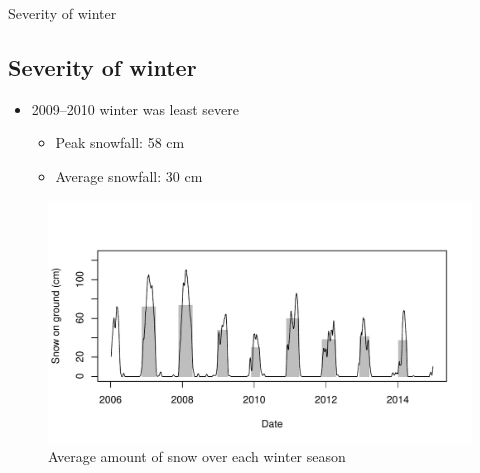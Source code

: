 \documentclass{beamer}
\begin{document}
\begin{frame}{Severity of winter}

\subsection{Severity of winter}

\begin{itemize}
\item 2009--2010 winter was least severe
\begin{itemize}
\item Peak snowfall: 58 cm
\item Average snowfall: 30 cm
\end{itemize}
\end{itemize}

\begin{figure}
\vspace{-12mm}
\includegraphics[width=1.0\textwidth]{report-barplots}
\vspace{-5mm}
\caption{{\footnotesize Average amount of snow over each winter season}}
\end{figure}

\end{frame}
\end{document}
